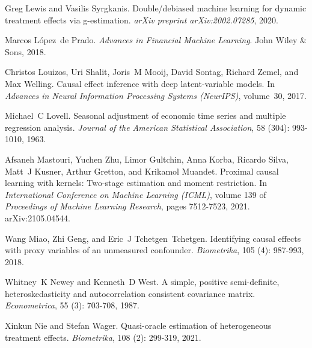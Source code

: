 Greg Lewis and Vasilis Syrgkanis.
\newblock Double/debiased machine learning for dynamic treatment effects via g-estimation.
\newblock \emph{arXiv preprint arXiv:2002.07285}, 2020.

Marcos L{\'o}pez~de Prado.
\newblock \emph{Advances in Financial Machine Learning}.
\newblock John Wiley \& Sons, 2018.

Christos Louizos, Uri Shalit, Joris~M Mooij, David Sontag, Richard Zemel, and Max Welling.
\newblock Causal effect inference with deep latent-variable models.
\newblock In \emph{Advances in Neural Information Processing Systems (NeurIPS)}, volume~30, 2017.

Michael~C Lovell.
\newblock Seasonal adjustment of economic time series and multiple regression analysis.
\newblock \emph{Journal of the American Statistical Association}, 58 (304): 993-1010, 1963.

Afsaneh Mastouri, Yuchen Zhu, Limor Gultchin, Anna Korba, Ricardo Silva, Matt~J Kusner, Arthur Gretton, and Krikamol Muandet.
\newblock Proximal causal learning with kernels: Two-stage estimation and moment restriction.
\newblock In \emph{International Conference on Machine Learning (ICML)}, volume 139 of \emph{Proceedings of Machine Learning Research}, pages 7512-7523, 2021.
\newblock arXiv:2105.04544.

Wang Miao, Zhi Geng, and Eric~J Tchetgen~Tchetgen.
\newblock Identifying causal effects with proxy variables of an unmeasured confounder.
\newblock \emph{Biometrika}, 105 (4): 987-993, 2018.

Whitney~K Newey and Kenneth~D West.
\newblock A simple, positive semi-definite, heteroskedasticity and autocorrelation consistent covariance matrix.
\newblock \emph{Econometrica}, 55 (3): 703-708, 1987.

Xinkun Nie and Stefan Wager.
\newblock Quasi-oracle estimation of heterogeneous treatment effects.
\newblock \emph{Biometrika}, 108 (2): 299-319, 2021.

